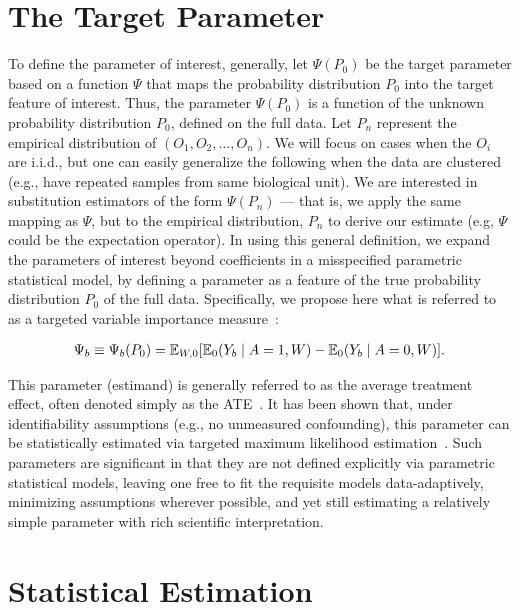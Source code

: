 \section{The Target Parameter}\label{targetparam}

To define the parameter of interest, generally, let $\Psi(P_{0})$ be the
target parameter based on a function $\Psi$ that maps the probability
distribution $P_{0}$ into the target feature of interest. Thus, the parameter
$\Psi(P_{0})$ is a function of the unknown probability distribution $P_{0}$,
defined on the full data. Let $P_{n}$ represent the  empirical distribution of
$(O_{1},O_{2}, \dots, O_{n})$. We will focus on cases when the $O_i$ are
i.i.d., but one can easily generalize the following when the data are clustered
(e.g., have repeated samples from same biological unit). We are interested in
substitution estimators of the form $\Psi(P_{n})$ --- that is, we apply the same
mapping as $\Psi$, but to the empirical distribution, $P_n$ to derive our
estimate (e.g, $\Psi$ could be the expectation operator). In using this general
definition, we expand the parameters of interest beyond coefficients in a
misspecified parametric statistical model, by defining a parameter as a feature
of the true probability distribution $P_{0}$ of the full data. Specifically, we
propose here what is referred to as a targeted variable importance
measure~\cite{bembom2009biomarker}:

\begin{eqnarray}
\label{eqn:targetparam}
\Psi_{b} \equiv \Psi_{b}(P_{0}) = \mathbb{E} _{W,0}[\mathbb{E}_{0}(Y_{b} \mid A = 1, W) - \mathbb{E}_{0}(Y_{b} \mid A = 0, W)].
\end{eqnarray}

This parameter (estimand) is generally referred to as the average treatment
effect, often denoted simply as the ATE~\cite{rosenbaum1983central}. It has
been shown that, under identifiability assumptions (e.g., no unmeasured
confounding), this parameter can be statistically estimated via targeted
maximum likelihood estimation~\cite{van2011targeted}. Such parameters are
significant in that they are not defined explicitly via parametric statistical
models, leaving one free to fit the requisite models data-adaptively, minimizing
assumptions wherever possible, and yet still estimating a relatively simple
parameter with rich scientific interpretation.

\section{Statistical Estimation}\label{estimation}

